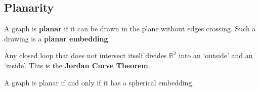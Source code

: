 \documentclass[12pt]{article}
\begin{document}
\subsection{Planarity}
A graph is {\bf planar} if it can be drawn in the plane without edges crossing. Such a drawing is a {\bf planar embedding}.

Any closed loop that does not intersect itself divides $\mathbb{R}^2$ into an `outside' and an `inside'. This is the {\bf Jordan Curve Theorem}.

\begin{theorem}
A graph is planar if and only if it has a spherical embedding.
\end{theorem}
\end{document}
